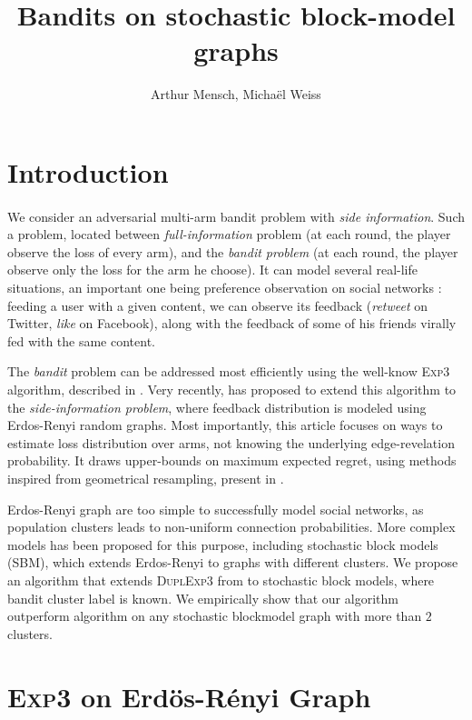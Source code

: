 \documentclass[11pt,a4paper]{article}
\title{Bandits on stochastic block-model graphs}
\author{Arthur Mensch, Michaël Weiss}
\begin{document}
\maketitle

\section{Introduction}
\paragraph{}We consider an adversarial multi-arm bandit problem with \textit{side information}. Such a problem, located between \textit{full-information} problem (at each round, the player observe the loss of every arm), and the \textit{bandit problem} (at each round, the player observe only the loss for the arm he choose). It can model several real-life situations, an important one being preference observation on social networks : feeding a user with a given content, we can observe its feedback (\textit{retweet} on Twitter, \textit{like} on Facebook), along with the feedback of some of his friends virally fed with the same content.

The \textit{bandit} problem can be addressed most efficiently using the well-know \textsc{Exp3} algorithm, described in \cite{exp3}. Very recently, \cite{valko} has proposed to extend this algorithm to the \textit{side-information problem}, where feedback distribution is modeled using Erdos-Renyi random graphs. Most importantly, this article focuses on ways to estimate loss distribution over arms, not knowing the underlying edge-revelation probability. It draws upper-bounds on maximum expected regret, using methods inspired from geometrical resampling, present in \cite{neu}.

Erdos-Renyi graph are too simple to successfully model social networks, as population clusters leads to non-uniform connection probabilities. More complex models has been proposed for this purpose, including stochastic block models (SBM), which extends Erdos-Renyi to graphs with different clusters. We propose an algorithm that extends \textsc{DuplExp3} from \cite{valko} to stochastic block models, where bandit cluster label is known. We empirically show that our algorithm outperform \cite{valko} algorithm on any stochastic blockmodel graph with more than $2$ clusters. 

\section{\textsc{Exp3} on Erdös-Rényi Graph}
\end{document}
